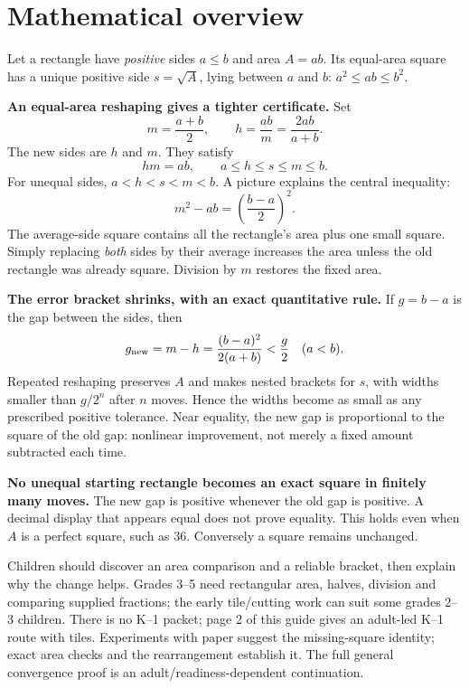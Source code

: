 \documentclass[11pt,letterpaper]{article}
\begin{document}
\section*{Mathematical overview}
Let a rectangle have \emph{positive} sides $a\le b$ and area $A=ab$. Its equal-area square has a unique positive side $s=\sqrt A$, lying between $a$ and $b$: $a^2\le ab\le b^2$.

\textbf{An equal-area reshaping gives a tighter certificate.} Set
\[m=\frac{a+b}{2},\qquad h=\frac{ab}{m}=\frac{2ab}{a+b}.\]
The new sides are $h$ and $m$. They satisfy
\[hm=ab,\qquad a\le h\le s\le m\le b.\]
For unequal sides, $a<h<s<m<b$. A picture explains the central inequality:
\[m^2-ab=\left(\frac{b-a}{2}\right)^2.\]
The average-side square contains all the rectangle's area plus one small square. Simply replacing \emph{both} sides by their average increases the area unless the old rectangle was already square. Division by $m$ restores the fixed area.

\textbf{The error bracket shrinks, with an exact quantitative rule.} If $g=b-a$ is the gap between the sides, then
\[g_{\rm new}=m-h=\frac{(b-a)^2}{2(a+b)}<\frac g2\quad(a<b).\]
Repeated reshaping preserves $A$ and makes nested brackets for $s$, with widths smaller than $g/2^n$ after $n$ moves. Hence the widths become as small as any prescribed positive tolerance. Near equality, the new gap is proportional to the square of the old gap: nonlinear improvement, not merely a fixed amount subtracted each time.

\textbf{No unequal starting rectangle becomes an exact square in finitely many moves.} The new gap is positive whenever the old gap is positive. A decimal display that appears equal does not prove equality. This holds even when $A$ is a perfect square, such as $36$. Conversely a square remains unchanged.

Children should discover an area comparison and a reliable bracket, then explain why the change helps. Grades 3--5 need rectangular area, halves, division and comparing supplied fractions; the early tile/cutting work can suit some grades 2--3 children. There is no K--1 packet; page 2 of this guide gives an adult-led K--1 route with tiles. Experiments with paper suggest the missing-square identity; exact area checks and the rearrangement establish it. The full general convergence proof is an adult/readiness-dependent continuation.
\newpage
\end{document}
